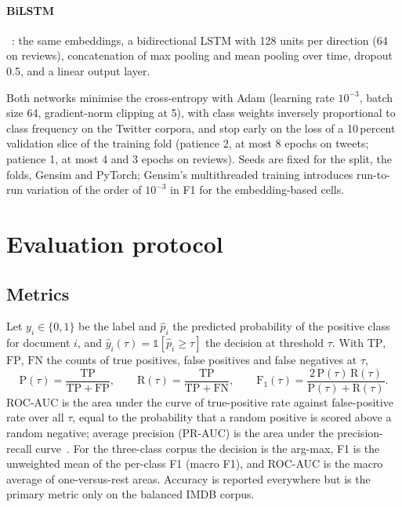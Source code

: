 \paragraph{BiLSTM}~\cite{hochreiter1997}: the same embeddings, a bidirectional LSTM with 128 units per direction (64 on reviews), concatenation of max pooling and mean pooling over time, dropout 0.5, and a linear output layer.

Both networks minimise the cross-entropy with Adam (learning rate $10^{-3}$, batch size 64, gradient-norm clipping at 5), with class weights inversely proportional to class frequency on the Twitter corpora, and stop early on the loss of a 10\,percent validation slice of the training fold (patience 2, at most 8 epochs on tweets; patience 1, at most 4 and 3 epochs on reviews). Seeds are fixed for the split, the folds, Gensim and PyTorch; Gensim's multithreaded training introduces run-to-run variation of the order of $10^{-3}$ in F1 for the embedding-based cells.

\section{Evaluation protocol}
\label{sec:protocol}
\subsection{Metrics}
Let $y_i \in \{0, 1\}$ be the label and $\hat{p}_i$ the predicted probability of the positive class for document $i$, and $\hat{y}_i(\tau) = \mathbb{1}[\hat{p}_i \ge \tau]$ the decision at threshold $\tau$. With $\mathrm{TP}$, $\mathrm{FP}$, $\mathrm{FN}$ the counts of true positives, false positives and false negatives at $\tau$,
\begin{equation}
\mathrm{P}(\tau) = \frac{\mathrm{TP}}{\mathrm{TP}+\mathrm{FP}}, \qquad
\mathrm{R}(\tau) = \frac{\mathrm{TP}}{\mathrm{TP}+\mathrm{FN}}, \qquad
\mathrm{F}_1(\tau) = \frac{2\,\mathrm{P}(\tau)\,\mathrm{R}(\tau)}{\mathrm{P}(\tau)+\mathrm{R}(\tau)}.
\end{equation}
ROC-AUC is the area under the curve of true-positive rate against false-positive rate over all $\tau$, equal to the probability that a random positive is scored above a random negative; average precision (PR-AUC) is the area under the precision-recall curve~\cite{davis2006}. For the three-class corpus the decision is the arg-max, F1 is the unweighted mean of the per-class F1 (macro F1), and ROC-AUC is the macro average of one-versus-rest areas. Accuracy is reported everywhere but is the primary metric only on the balanced IMDB corpus.

